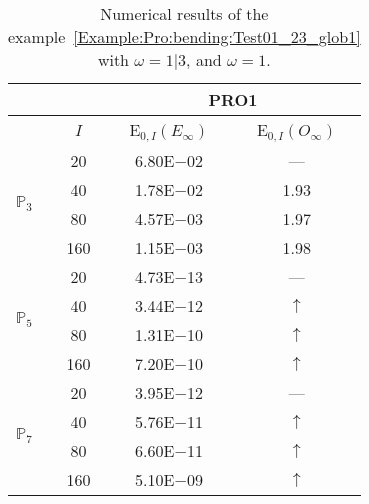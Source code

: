 \begin{table}[H]
\caption{Numerical results of the example~\ref{Example:Pro:bending:Test01_23_glob1} with $\omega=1|3$, and $\omega=1$.}
\setlength{\tabcolsep}{5pt}
\centering
\begin{tabular}{@{}l c c c@{}}
\toprule
 &  & \multicolumn{2}{c}{PRO1}\\
\midrule
 & $I$ & E$_{0,I}(E_{\infty})$ & E$_{0,I}(O_{\infty})$\\
\midrule
\multirow{4}{*}{$\mathbb{P}_{3}$} & 20 & 6.80E$-$02 & ---\\
 & 40 & 1.78E$-$02 & 1.93\\
 & 80 & 4.57E$-$03 & 1.97\\
 & 160 & 1.15E$-$03 & 1.98\\
\midrule
\multirow{4}{*}{$\mathbb{P}_{5}$} & 20 & 4.73E$-$13 & ---\\
 & 40 & 3.44E$-$12 & $\uparrow$\\
 & 80 & 1.31E$-$10 & $\uparrow$\\
 & 160 & 7.20E$-$10 & $\uparrow$\\
\midrule
\multirow{4}{*}{$\mathbb{P}_{7}$} & 20 & 3.95E$-$12 & ---\\
 & 40 & 5.76E$-$11 & $\uparrow$\\
 & 80 & 6.60E$-$11 & $\uparrow$\\
 & 160 & 5.10E$-$09 & $\uparrow$\\
\bottomrule
\end{tabular}
\label{Table:PRO:test_01_23_test10}
\end{table}
